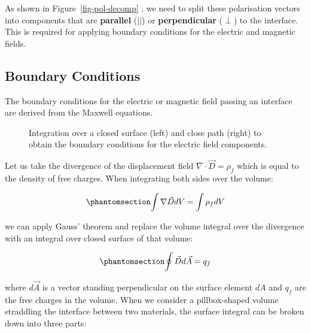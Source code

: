 \documentclass[
  a4paper,
]{book}
\begin{document}
As shown in Figure~\ref{fig-pol-decomp} , we need to split these
polarisation vectors into components that are \textbf{parallel} (\(||\))
or \textbf{perpendicular} (\(\perp\)) to the interface. This is required
for applying boundary conditions for the electric and magnetic fields.

\subsection{Boundary Conditions}\label{boundary-conditions}

The boundary conditions for the electric or magnetic field passing an
interface are derived from the Maxwell equations.

\begin{figure}


\caption{\label{fig-boundary}Integration over a closed surface (left)
and close path (right) to obtain the boundary conditions for the
electric field components.}

\end{figure}%

Let us take the divergence of the displacement field
\(\nabla \cdot \vec{D}=\rho_f\) which is equal to the density of free
charges. When integrating both sides over the volume:

\begin{equation}\phantomsection\label{eq-divergence}{
\int\nabla \vec{D} dV=\int \rho_f dV
}\end{equation}

we can apply Gauss' theorem and replace the volume integral over the
divergence with an integral over closed surface of that volume:

\begin{equation}\phantomsection\label{eq-gauss}{
\oint \vec{D} d\vec{A}= q_f
}\end{equation}

where \(d\vec{A}\) is a vector standing perpendicular on the surface
element \(dA\) and \(q_f\) are the free charges in the volume. When we
consider a pillbox-shaped volume straddling the interface between two
materials, the surface integral can be broken down into three parts:
\end{document}
